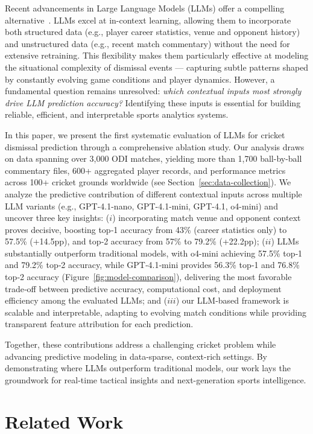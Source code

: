 \documentclass[sigconf,anonymous,review]{acmart}
\begin{document}
Recent advancements in Large Language Models (LLMs) offer a compelling alternative~\cite{gpt4_evaluation}. LLMs excel at in-context learning, allowing them to incorporate both structured data (e.g., player career statistics, venue and opponent history) and unstructured data (e.g., recent match commentary) without the need for extensive retraining. This flexibility makes them particularly effective at modeling the situational complexity of dismissal events — capturing subtle patterns shaped by constantly evolving game conditions and player dynamics. However, a fundamental question remains unresolved: \emph{which contextual inputs most strongly drive LLM prediction accuracy?} Identifying these inputs is essential for building reliable, efficient, and interpretable sports analytics systems.

In this paper, we present the first systematic evaluation of LLMs for cricket dismissal prediction through a comprehensive ablation study. Our analysis draws on data spanning over 3,000 ODI matches, yielding more than 1,700 ball-by-ball commentary files, 600+ aggregated player records, and performance metrics across 100+ cricket grounds worldwide (see Section~\ref{sec:data-collection}). We analyze the predictive contribution of different contextual inputs across multiple LLM variants (e.g., GPT-4.1-nano, GPT-4.1-mini, GPT-4.1, o4-mini) and uncover three key insights: ($i$) incorporating match venue and opponent context proves decisive, boosting top‑1 accuracy from 43\% (career statistics only) to 57.5\% (+14.5pp), and top‑2 accuracy from 57\% to 79.2\% (+22.2pp); ($ii$) LLMs substantially outperform traditional models, with o4-mini achieving 57.5\% top‑1 and 79.2\% top‑2 accuracy, while GPT‑4.1‑mini provides 56.3\% top‑1 and 76.8\% top‑2 accuracy (Figure~\ref{fig:model-comparison}), delivering the most favorable trade‑off between predictive accuracy, computational cost, and deployment efficiency among the evaluated LLMs; and ($iii$) our LLM‑based framework is scalable and interpretable, adapting to evolving match conditions while providing transparent feature attribution for each prediction.

Together, these contributions address a challenging cricket problem while advancing predictive modeling in data-sparse, context-rich settings. By demonstrating where LLMs outperform traditional models, our work lays the groundwork for real-time tactical insights and next-generation sports intelligence.


\section{Related Work}
\end{document}
